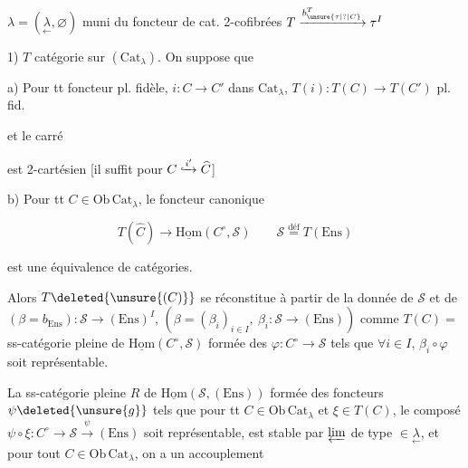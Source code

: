 $\lambda=(\underset{\leftarrow}{\lambda},\varnothing)$ \qquad muni du foncteur de cat. 2-cofibrées $T\xrightarrow{b^T_{\unsure{\tau|?|C}}}\tau^I$

1) $T$ catégorie  sur $(\mathrm{Cat}_\lambda)$. On suppose que 

a) Pour tt foncteur pl. fidèle, $i:C\to C'$ dans $\mathrm{Cat}_\lambda$, $T(i):T(C)\to T(C')$ pl. fid.

 et le carré


est 2-cartésien [il  suffit pour $C\lhook\joinrel\xrightarrow{i'}\widehat C$]


b) Pour tt $C\in\mathrm{Ob}\,\mathrm{Cat}_\lambda$, le foncteur canonique

\[T(\widehat C)\longrightarrow\underline{\mathrm{Hom}}(C^\circ,\mathscr S)\qquad \mathscr S\overset{\mathrm{déf}}=T(\mathrm{Ens})\]

est une équivalence de catégories.

Alors $T\deleted{\unsure{(C)}}$ se réconstitue à partir de la donnée de $\mathscr S$ et de $(\beta=b_{\mathrm{Ens}}):\mathscr S\to(\mathrm{Ens})^I$, $(\beta=(\beta_i)_{i\in I},\ \beta_i:\mathscr S\to(\mathrm{Ens}))$ comme $T(C)=$ ss-catégorie pleine de $\underline{\mathrm{Hom}}(C^\circ,\mathscr S)$ formée des $\varphi:C^\circ\to\mathscr S$ tels que $\forall i\in I$, $\beta_i\circ\varphi$ soit représentable.


 La ss-catégorie pleine $R$ de $\underline{\mathrm{Hom}}(\mathscr S,(\mathrm{Ens}))$ formée des foncteurs $\psi\deleted{\unsure{g}}$ tels que pour tt $C\in\mathrm{Ob}\,\mathrm{Cat}_\lambda$ \deleted{\unsure{$\xi$}} et $\xi\in T(C)$, le composé $\psi\circ\xi:C^\circ\longrightarrow\mathscr S\xrightarrow{\psi}(\mathrm{Ens})$ soit représentable, est stable par $\varprojlim$ de type $\in\underset{\leftarrow}{\lambda}$,  et pour tout $C\in\mathrm{Ob}\,\mathrm{Cat}_\lambda$, on a un accouplement

